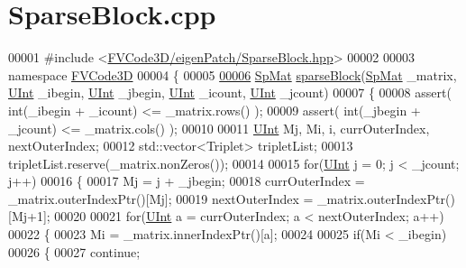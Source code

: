 \hypertarget{SparseBlock_8cpp_source}{}\section{Sparse\+Block.\+cpp}
\label{SparseBlock_8cpp_source}

\begin{DoxyCode}
00001 \textcolor{preprocessor}{#include <\hyperlink{SparseBlock_8hpp}{FVCode3D/eigenPatch/SparseBlock.hpp}>}
00002 
00003 \textcolor{keyword}{namespace }\hyperlink{namespaceFVCode3D}{FVCode3D}
00004 \{
00005 
\hypertarget{SparseBlock_8cpp_source.tex_l00006}{}\hyperlink{namespaceFVCode3D_a50584b1c52af8d3b79fe5b0bcc18b2e1}{00006} \hyperlink{namespaceFVCode3D_ac1032289d96638cf0ad6c52ef639095f}{SpMat} \hyperlink{namespaceFVCode3D_a50584b1c52af8d3b79fe5b0bcc18b2e1}{sparseBlock}(\hyperlink{namespaceFVCode3D_ac1032289d96638cf0ad6c52ef639095f}{SpMat} \_matrix, \hyperlink{namespaceFVCode3D_a4bf7e328c75d0fd504050d040ebe9eda}{UInt} \_ibegin, \hyperlink{namespaceFVCode3D_a4bf7e328c75d0fd504050d040ebe9eda}{UInt} \_jbegin, 
      \hyperlink{namespaceFVCode3D_a4bf7e328c75d0fd504050d040ebe9eda}{UInt} \_icount, \hyperlink{namespaceFVCode3D_a4bf7e328c75d0fd504050d040ebe9eda}{UInt} \_jcount)
00007 \{
00008     assert( \textcolor{keywordtype}{int}(\_ibegin + \_icount) <= \_matrix.rows() );
00009     assert( \textcolor{keywordtype}{int}(\_jbegin + \_jcount) <= \_matrix.cols() );
00010 
00011     \hyperlink{namespaceFVCode3D_a4bf7e328c75d0fd504050d040ebe9eda}{UInt} Mj, Mi, i, currOuterIndex, nextOuterIndex;
00012     std::vector<Triplet> tripletList;
00013     tripletList.reserve(\_matrix.nonZeros());
00014 
00015     \textcolor{keywordflow}{for}(\hyperlink{namespaceFVCode3D_a4bf7e328c75d0fd504050d040ebe9eda}{UInt} j = 0; j < \_jcount; j++)
00016     \{
00017         Mj = j + \_jbegin;
00018         currOuterIndex = \_matrix.outerIndexPtr()[Mj];
00019         nextOuterIndex = \_matrix.outerIndexPtr()[Mj+1];
00020 
00021         \textcolor{keywordflow}{for}(\hyperlink{namespaceFVCode3D_a4bf7e328c75d0fd504050d040ebe9eda}{UInt} a = currOuterIndex; a < nextOuterIndex; a++)
00022         \{
00023             Mi = \_matrix.innerIndexPtr()[a];
00024 
00025             \textcolor{keywordflow}{if}(Mi < \_ibegin)
00026             \{
00027                 \textcolor{keywordflow}{continue};

\end{DoxyCode}
